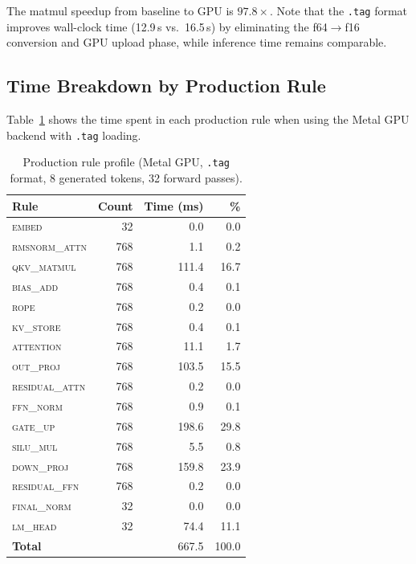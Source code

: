 \documentclass[acmsmall,nonacm]{acmart}
\begin{document}
The matmul speedup from baseline to GPU is $97.8\times$.  Note that
the \texttt{.tag} format improves wall-clock time (12.9\,s vs.\ 16.5\,s)
by eliminating the f64$\to$f16 conversion and GPU upload phase, while
inference time remains comparable.

\subsection{Time Breakdown by Production Rule}

Table~\ref{tab:profile} shows the time spent in each production rule
when using the Metal GPU backend with \texttt{.tag} loading.

\begin{table}[h]
\centering
\caption{Production rule profile (Metal GPU, \texttt{.tag} format,
  8 generated tokens, 32 forward passes).}
\label{tab:profile}
\begin{tabular}{lrrr}
\toprule
\textbf{Rule} & \textbf{Count} & \textbf{Time (ms)} & \textbf{\%} \\
\midrule
\textsc{embed}          &  32 &   0.0 &  0.0 \\
\textsc{rmsnorm\_attn}  & 768 &   1.1 &  0.2 \\
\textsc{qkv\_matmul}    & 768 & 111.4 & 16.7 \\
\textsc{bias\_add}      & 768 &   0.4 &  0.1 \\
\textsc{rope}           & 768 &   0.2 &  0.0 \\
\textsc{kv\_store}      & 768 &   0.4 &  0.1 \\
\textsc{attention}      & 768 &  11.1 &  1.7 \\
\textsc{out\_proj}      & 768 & 103.5 & 15.5 \\
\textsc{residual\_attn} & 768 &   0.2 &  0.0 \\
\textsc{ffn\_norm}      & 768 &   0.9 &  0.1 \\
\textsc{gate\_up}       & 768 & 198.6 & 29.8 \\
\textsc{silu\_mul}      & 768 &   5.5 &  0.8 \\
\textsc{down\_proj}     & 768 & 159.8 & 23.9 \\
\textsc{residual\_ffn}  & 768 &   0.2 &  0.0 \\
\textsc{final\_norm}    &  32 &   0.0 &  0.0 \\
\textsc{lm\_head}       &  32 &  74.4 & 11.1 \\
\midrule
\textbf{Total}          &     & 667.5 & 100.0 \\
\bottomrule
\end{tabular}
\end{table}
\end{document}
